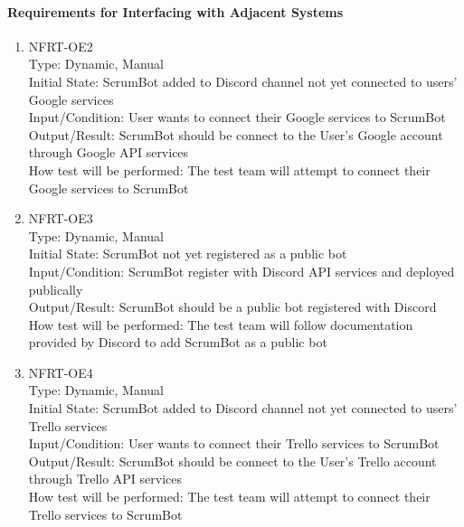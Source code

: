 \documentclass[12pt, titlepage]{article}
\begin{document}
\paragraph{Requirements for Interfacing with Adjacent Systems}
\begin{enumerate}

\item{NFRT-OE2}\\
Type: Dynamic, Manual\\
Initial State: ScrumBot added to Discord channel not yet connected to users' Google services\\
Input/Condition: User wants to connect their Google services to ScrumBot\\
Output/Result: ScrumBot should be connect to the User's Google account through Google API services\\
How test will be performed: The test team will attempt to connect their Google services to ScrumBot

\item{NFRT-OE3}\\
Type: Dynamic, Manual\\
Initial State: ScrumBot not yet registered as a public bot\\
Input/Condition: ScrumBot register with Discord API services and deployed publically\\
Output/Result: ScrumBot should be a public bot registered with Discord\\
How test will be performed: The test team will follow documentation provided by Discord to add ScrumBot as a public bot

\item{NFRT-OE4}\\
Type: Dynamic, Manual\\
Initial State: ScrumBot added to Discord channel not yet connected to users' Trello services\\
Input/Condition: User wants to connect their Trello services to ScrumBot\\
Output/Result: ScrumBot should be connect to the User's Trello account through Trello API services\\
How test will be performed: The test team will attempt to connect their Trello services to ScrumBot
\end{enumerate}
\end{document}
